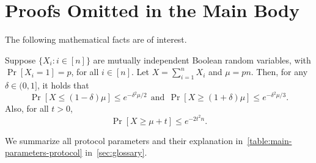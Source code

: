 \section{Proofs Omitted in the Main Body}
\label{sec:proofs-omitted}

The following mathematical facts are of interest.

\begin{theorem}
    \label{thm:chernoff-bounds}

    Suppose $\{X_i: i \in [n]\}$ are mutually independent Boolean random variables, with $\Pr[X_i = 1] = p$, for all $i \in [n]$. Let $X =\sum^n_{i = 1} X_i$ and $\mu = pn$.
    Then, for any $\delta \in (0, 1]$, it holds that
    \[
        \Pr [X \le (1 - \delta) \mu] \le e^{- \delta^2 \mu / 2}
        ~~\text{and}~~
        \Pr [X \ge (1 + \delta) \mu] \le e^{- \delta^2 \mu / 3}.
    \]
    Also, for all $t > 0$,
    \[ \Pr[X \ge \mu + t] \le e^{-2 t^2 n}. \]
\end{theorem}

We summarize all protocol parameters and their explanation in~\cref{table:main-parameters-protocol} in~\cref{sec:glossary}.



